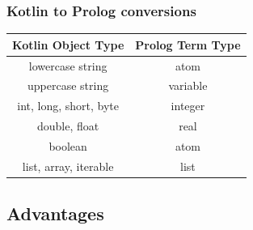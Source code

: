 \documentclass[presentation]{beamer}
\begin{document}
\begin{frame}%
    \frametitle{Kotlin to Prolog conversions}

    \begin{table}[]
        \centering
        \begin{tabular}{c|c}
            \textbf{Kotlin Object Type}        & \textbf{Prolog Term Type} \\
            \hline\hline
            lowercase string       & atom            \\
            uppercase string       & variable        \\
            int, long, short, byte & integer         \\
            double, float          & real            \\
            boolean                & atom            \\
            list, array, iterable  & list
        \end{tabular}
    \end{table}

\end{frame}

\subsection{Advantages}
\end{document}

